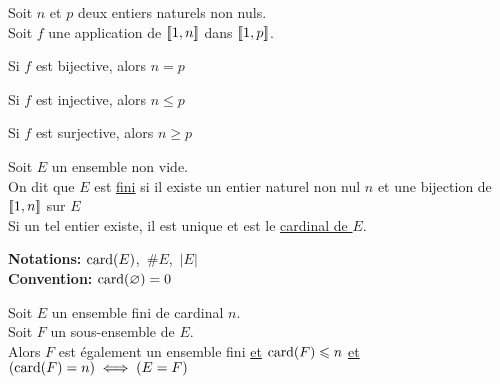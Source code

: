 \documentclass[12pt,twoside,a4paper]{article}
\author{MPSI 2}
\begin{document}
	\maketitle
	\begin{prop}
		Soit $n$ et $p$ deux entiers naturels non nuls.\\
		Soit $f$ une application de $[\![ 1,n]\!]$ dans $[\![ 1,p]\!]$.\\
		\begin{liste}
			\item Si $f$ est bijective, alors $n=p$
			\item Si $f$ est injective, alors $n\leqslant p$
			\item Si $f$ est surjective, alors $n\geqslant p$
		\end{liste}
	\end{prop}
	\begin{defi}
		Soit $E$ un ensemble non vide.\\
		On dit que $E$ est \underline{fini} si il existe un entier naturel non nul $n$ et une bijection de $[\![ 1,n]\!]$ sur $E$\\
		Si un tel entier existe, il est unique et est le \underline{cardinal de $E$}.
	\end{defi}
	\begin{flushleft}
		\textbf{Notations:} $\text{card}(E)$,\ \#$E$,\ $|E|$\\
		\textbf{Convention:} $\text{card}(\varnothing)=0$
	\end{flushleft}
	\begin{prop}
		Soit $E$ un ensemble fini de cardinal $n$.\\
		Soit $F$ un sous-ensemble de $E$.\\
		Alors $F$ est \'egalement un ensemble fini \underline{et} $\text{card}(F)\leqslant n$ \underline{et} $(\text{card}(F)=n)\iff(E=F)$
	\end{prop}
\end{document}

